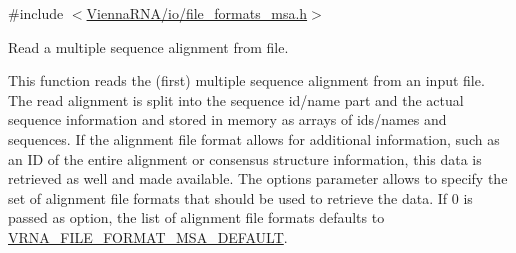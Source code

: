 {\ttfamily \#include $<$\hyperlink{io_2file__formats__msa_8h}{Vienna\+R\+N\+A/io/file\+\_\+formats\+\_\+msa.\+h}$>$}



Read a multiple sequence alignment from file. 

This function reads the (first) multiple sequence alignment from an input file. The read alignment is split into the sequence id/name part and the actual sequence information and stored in memory as arrays of ids/names and sequences. If the alignment file format allows for additional information, such as an ID of the entire alignment or consensus structure information, this data is retrieved as well and made available. The {\ttfamily options} parameter allows to specify the set of alignment file formats that should be used to retrieve the data. If 0 is passed as option, the list of alignment file formats defaults to \hyperlink{group__file__formats__msa_ga4acc255373831856a8417b68de8a94c0}{V\+R\+N\+A\+\_\+\+F\+I\+L\+E\+\_\+\+F\+O\+R\+M\+A\+T\+\_\+\+M\+S\+A\+\_\+\+D\+E\+F\+A\+U\+LT}.

